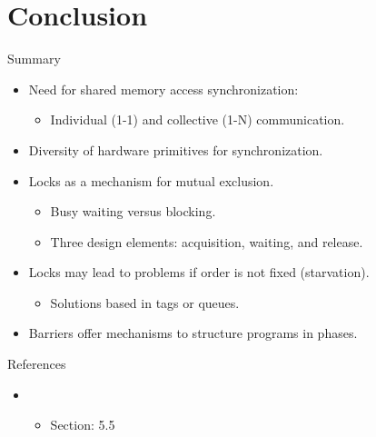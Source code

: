 \section{Conclusion}

\begin{frame}[t]{Summary}
\begin{itemize}[<+->]
  \item Need for shared memory access synchronization:
    \begin{itemize}
      \item Individual (1-1) and collective (1-N) communication.
    \end{itemize}
  \item Diversity of hardware primitives for synchronization.
  \item Locks as a mechanism for mutual exclusion.
    \begin{itemize}
      \item Busy waiting versus blocking.
      \item Three design elements: acquisition, waiting, and release.
    \end{itemize}
  \item Locks may lead to problems if order is not fixed (starvation).
    \begin{itemize}
      \item Solutions based in tags or queues.
    \end{itemize}
  \item Barriers offer mechanisms to structure programs in phases.
\end{itemize}
\end{frame}


\begin{frame}[t]{References}
\begin{itemize}
  \item \bibhennessy
    \begin{itemize}
      \item Section: 5.5
    \end{itemize}

\end{itemize}
\end{frame}
